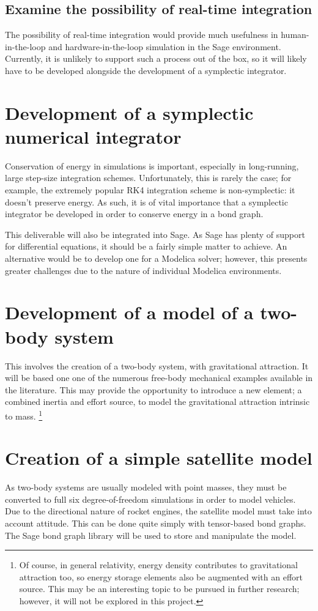 \documentclass[utf8,a4paper,12pt]{report}
\begin{document}
\subsection{Examine the possibility of real-time integration}
The possibility of real-time integration would provide much usefulness in human-in-the-loop and hardware-in-the-loop simulation in the Sage environment. Currently, it is unlikely to support such a process out of the box, so it will likely have to be developed alongside the development of a symplectic integrator.

\section{Development of a symplectic numerical integrator}
Conservation of energy in simulations is important, especially in long-running, large step-size integration schemes. Unfortunately, this is rarely the case; for example, the extremely popular RK4 integration scheme is non-symplectic: it doesn't preserve energy. As such, it is of vital importance that a symplectic integrator be developed in order to conserve energy in a bond graph.

This deliverable will also be integrated into Sage. As Sage has plenty of support for differential equations, it should be a fairly simple matter to achieve. An alternative would be to develop one for a Modelica solver; however, this presents greater challenges due to the nature of individual Modelica environments.

\section{Development of a model of a two-body system}
This involves the creation of a two-body system, with gravitational attraction. It will be based one one of the numerous free-body mechanical examples available in the literature. This may provide the opportunity to introduce a new element; a combined inertia and effort source, to model the gravitational attraction intrinsic to mass. \footnote{Of course, in general relativity, energy density contributes to gravitational attraction too, so energy storage elements also be augmented with an effort source. This may be an interesting topic to be pursued in further research; however, it will not be explored in this project.} 

\section{Creation of a simple satellite model}
As two-body systems are usually modeled with point masses, they must be converted to full six degree-of-freedom simulations in order to model vehicles. Due to the directional nature of rocket engines, the satellite model must take into account attitude. This can be done quite simply with tensor-based bond graphs. The Sage bond graph library will be used to store and manipulate the model.
\end{document}
